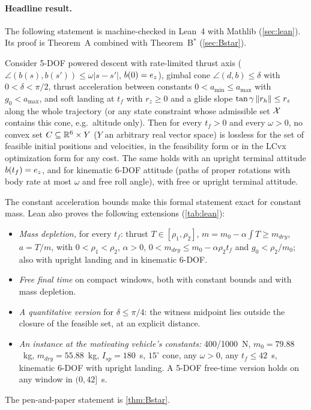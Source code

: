 \paragraph{Headline result.}
The following statement is machine-checked in Lean~4 with Mathlib (\cref{sec:lean}). Its proof is Theorem~A combined with
Theorem~B$^*$ (\cref{sec:Bstar}).
\begin{maintheorem}[machine-checked]
Consider 5-DOF powered descent with rate-limited thrust axis ($\angle(b(s),b(s'))\le\omega|s-s'|$, $b(0)=e_z$), gimbal cone
$\angle(d,b)\le\delta$ with $0<\delta<\pi/2$, thrust acceleration between constants $0<a_{\min}\le a_{\max}$ with $g_0<a_{\max}$, and
soft landing at $t_f$ with $r_z\ge0$ and a glide slope $\tan\gamma\,\lVert r_h\rVert\le r_z$ along the whole trajectory (or any state constraint whose admissible set $\mathcal X$
contains this cone, e.g.\ altitude only). Then for every $t_f>0$ and every $\omega>0$, no convex set $C\subseteq\mathbb{R}^6\times Y$ ($Y$ an arbitrary real vector
space) is lossless for the set of feasible initial positions and velocities, in the feasibility form or in the LCvx
optimization form for any cost. The same holds with an upright terminal attitude $b(t_f)=e_z$, and for kinematic 6-DOF
attitude (paths of proper rotations with body rate at most $\omega$ and free roll angle), with free or upright terminal attitude.
\end{maintheorem}
The constant acceleration bounds make this formal statement exact for constant mass. Lean also proves the following
extensions (\cref{tab:lean}):
\begin{itemize}[leftmargin=*,itemsep=1pt]
\item \emph{Mass depletion,} for every $t_f$: thrust $T\in[\rho_1,\rho_2]$, $m=m_0-\alpha\int T\ge m_{dry}$, $a=T/m$, with $0<\rho_1<\rho_2$, $\alpha>0$,
$0<m_{dry}\le m_0-\alpha\rho_2t_f$ and $g_0<\rho_2/m_0$; also with upright landing and in kinematic 6-DOF.
\item \emph{Free final time} on compact windows, both with constant bounds and with mass depletion.
\item \emph{A quantitative version} for $\delta\le\pi/4$: the witness midpoint lies outside the closure of the feasible set, at an
explicit distance.
\item \emph{An instance at the motivating vehicle's constants:} 400/1000~N, $m_0=79.88$~kg, $m_{dry}=55.88$~kg, $I_{sp}=180$~s,
$15^\circ$ cone, any $\omega>0$, any $t_f\le42$~s, kinematic 6-DOF with upright landing. A 5-DOF free-time version holds on any
window in $(0,42]$~s.
\end{itemize}
The pen-and-paper statement is \cref{thm:Bstar}.

